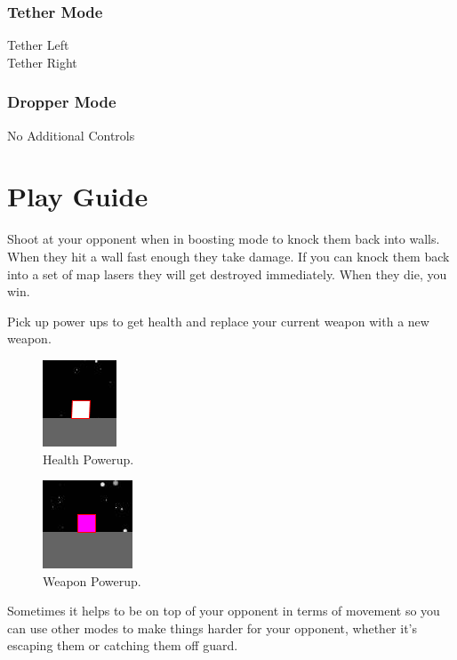 \documentclass[10pt,a4paper]{article}
\begin{document}
\subsubsection*{Tether Mode}

 \makebox[0.5cm]{-} Tether Left
\\ \makebox[0.5cm]{-} Tether Right

\subsubsection*{Dropper Mode}

No Additional Controls

\section{Play Guide}

Shoot at your opponent when in boosting mode to knock them back into walls. When they hit a wall fast enough they take damage. If you can knock them back into a set of map lasers they will get destroyed immediately. When they die, you win.

Pick up power ups to get health and replace your current weapon with a new weapon.

\begin{figure}[!h]
\centering
  \includegraphics{health_powerup.png}
  \caption{Health Powerup.}
  \label{fig:boat1}
\end{figure}

\begin{figure}[!h]
\centering
  \includegraphics{weapon_powerup.png}
  \caption{Weapon Powerup.}
  \label{fig:boat1}
\end{figure}

Sometimes it helps to be on top of your opponent in terms of movement so you can use other modes to make things harder for your opponent, whether it's escaping them or catching them off guard.
\end{document}
